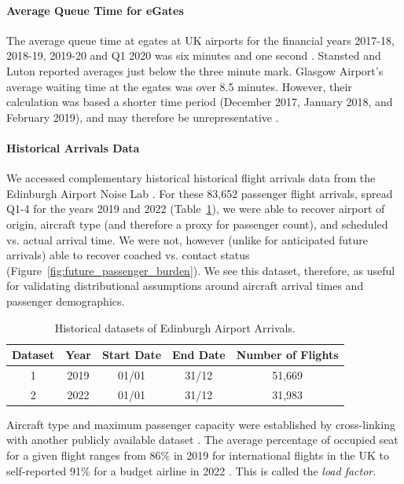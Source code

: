 \documentclass[10pt]{article}
\begin{document}
\paragraph{Average Queue Time for eGates}
The average queue time at \glspl{egate} at UK airports for the financial years 2017-18, 2018-19, 2019-20 and Q1 2020 was six minutes and one second \cite{Inspection_eGates}. Stansted and Luton reported averages just below the three minute mark. Glasgow Airport's average waiting time at the \glspl{egate} was over 8.5 minutes. However, their calculation was based a shorter time period (December 2017, January 2018, and February 2019), and may therefore be unrepresentative \cite{Inspection_eGates}.


\paragraph{Historical Arrivals Data}
We accessed complementary historical historical flight arrivals data from the Edinburgh Airport Noise Lab \cite{noise_lab}. For these 83,652 passenger flight arrivals, spread Q1-4 for the years 2019 and 2022 (Table~\ref{tab:observed_arrivals_overview}), we were able to recover airport of origin, aircraft type (and therefore a proxy for passenger count), and scheduled vs. actual arrival time. We were not, however (unlike for anticipated future arrivals) able to recover coached vs. contact status (Figure~\ref{fig:future_passenger_burden}). We see this dataset, therefore, as useful for validating distributional assumptions around aircraft arrival times and passenger demographics. 


\begin{table}[!ht]
\caption{Historical datasets of Edinburgh Airport Arrivals.  }
\label{tab:observed_arrivals_overview}
\centering
\begin{tabular}{ccccc}
\hline
\multicolumn{1}{c}{\textbf{Dataset}} & \textbf{Year} & \textbf{Start Date} & \textbf{End Date} & \textbf{Number of Flights} \\ \hline
1  & 2019  & 01/01  & 31/12    &  51,669  \\
2  & 2022  & 01/01  & 31/12    &  31,983  \\
 \hline
\end{tabular}
\end{table}


Aircraft type and maximum passenger capacity were established by cross-linking with another publicly available dataset \cite{aircraft_capacity}. The average percentage of occupied seat for a given flight ranges from 86\% in 2019 for international flights in the UK \cite{loading_factor_national} to self-reported 91\% for a budget airline in 2022 \cite{loading_factor_ryanair}. This is called the \textit{load factor}.
\end{document}

